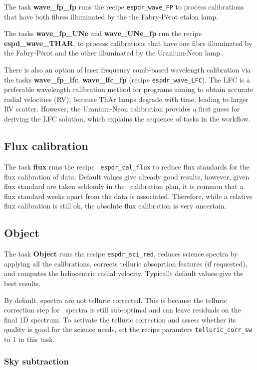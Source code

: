 The task {\bf wave\_fp\_fp} runs the recipe {\tt espdr\_wave\_FP} to
process calibrations that have both fibres illuminated by the the
Fabry-Pérot etalon lamp.

The tasks {\bf wave\_fp\_UNe} and {\bf wave\_UNe\_fp} run the recipe
{\bf espd\_wave\_THAR}, to process calibrations that have one fibre
illuminated by the Fabry-Pérot and the other illuminated by the
Uranium-Neon lamp.

There is also an option of laser frequency comb-based wavelength
calibration via the tasks {\bf wave\_fp\_lfc}, {\bf wave\_lfc\_fp}
(recipe {\tt espdr\_wave\_LFC}). The LFC is a preferable wavelength
calibration method for programs aiming to obtain accurate radial
velocities (RV), because ThAr lamps degrade with time, leading to
larger RV scatter. However, the Uranium-Neon calibration provides a
first guess for deriving the LFC solution, which explains the sequence
of tasks in the workflow.


\subsection{Flux calibration}
The task {\bf flux} runs the recipe {\tt
  espdr\_cal\_flux} to reduce flux standards for the flux calibration
of data. Default values give already good results, however, given flux
standard are taken seldomly in the \instname\ calibration plan, it is
common that a flux standard weeks apart from the data is
associated. Therefore, while a relative flux calibration is still ok,
the absolute flux calibration is very uncertain.

\subsection{Object}

The task {\bf Object} runs the recipe {\tt espdr\_sci\_red}, reduces
science spectra by applying all the calibrations, corrects telluric
absoprtion features (if requested), and computes the heliocentric
radial velocity. Typicallt default values give the best
results.

By default, spectra are not telluric corrected. This is because the
telluric correction step for \instname\ spectra is still sub-optimal and
can leave residuals on the final 1D spectrum. To activate the telluric
correction and assess whether its quality is good for the science
needs, set the recipe paramters {\tt telluric\_corr\_sw} to 1 in this
task.


\subsubsection{Sky subtraction}

